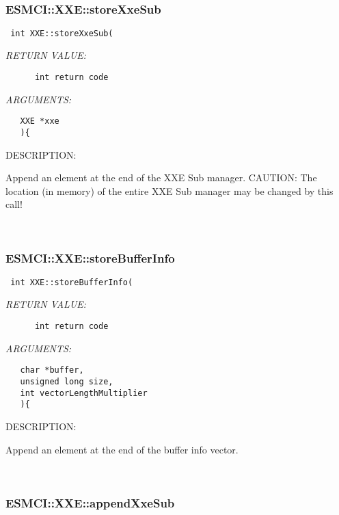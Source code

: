 \mbox{}\hrulefill\
 
\subsubsection [ESMCI::XXE::storeXxeSub] {ESMCI::XXE::storeXxeSub}


  
\begin{verbatim} int XXE::storeXxeSub(\end{verbatim}{\em RETURN VALUE:}
\begin{verbatim}      int return code\end{verbatim}{\em ARGUMENTS:}
\begin{verbatim}   XXE *xxe
   ){\end{verbatim}
{\sf DESCRIPTION:\\ }


    Append an element at the end of the XXE Sub manager.
    CAUTION: The location (in memory) of the entire XXE Sub manager may be
             changed by this call! 
 
\mbox{}\hrulefill\
 
\subsubsection [ESMCI::XXE::storeBufferInfo] {ESMCI::XXE::storeBufferInfo}


  
\begin{verbatim} int XXE::storeBufferInfo(\end{verbatim}{\em RETURN VALUE:}
\begin{verbatim}      int return code\end{verbatim}{\em ARGUMENTS:}
\begin{verbatim}   char *buffer,
   unsigned long size,
   int vectorLengthMultiplier
   ){\end{verbatim}
{\sf DESCRIPTION:\\ }


    Append an element at the end of the buffer info vector. 
 
\mbox{}\hrulefill\
 
\subsubsection [ESMCI::XXE::appendXxeSub] {ESMCI::XXE::appendXxeSub}


